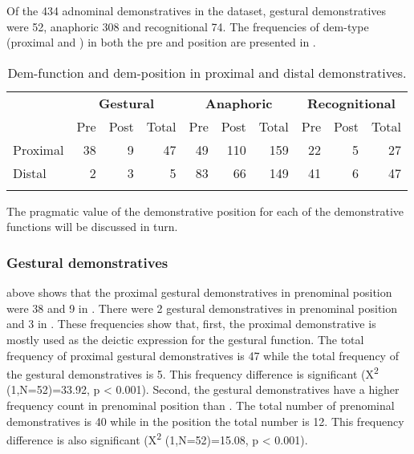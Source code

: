 \documentclass[output=paper,
modfonts
]{langscibook}
\begin{document}
Of the 434 adnominal demonstratives in the dataset, gestural demonstratives were 52, anaphoric 308 and recognitional 74. The frequencies of dem-type (proximal and ) in both the pre and  position are presented in .

\begin{table}
\begin{tabularx}{\textwidth}{X rrr  rrr  rrr} 
\lsptoprule
& \multicolumn{3}{c}{{\bfseries Gestural}} & \multicolumn{3}{c}{{\bfseries Anaphoric}} & \multicolumn{3}{c}{{\bfseries Recognitional}}\\\cmidrule(lr){2-4}\cmidrule(lr){5-7}\cmidrule(lr){8-10}
& Pre & Post & Total & Pre & Post & Total & Pre & Post & Total\\
\midrule
{ Proximal} & 38 & 9 & 47 & 49 & 110 & 159 & 22 & 5 & 27\\
{ Distal} & 2 & 3 & 5 & 83 & 66 & 149 & 41 & 6 & 47\\
\lspbottomrule
\end{tabularx}

\caption{Dem-function and dem-position in proximal and distal demonstratives.}
\label{tab:mwamzandi:3}
\end{table}

The pragmatic value of the demonstrative position for each of the demonstrative functions will be discussed in turn.

\subsubsection{Gestural demonstratives}\label{sec:mwamzandi:3.1.1}

 above shows that the proximal gestural demonstratives in prenominal position were 38 and 9 in . There were 2  gestural demonstratives in prenominal position and 3 in . These frequencies show that, first, the proximal demonstrative is mostly used as the deictic expression for the gestural function. The total frequency of proximal gestural demonstratives is 47 while the total frequency of the  gestural demonstratives is 5. This frequency difference is significant (X\textsuperscript{2} (1,N=52)=33.92, p < 0.001). Second, the gestural demonstratives have a higher frequency count in prenominal position than . The total number of prenominal demonstratives is 40 while in the  position the total number is 12. This frequency difference is also significant (X\textsuperscript{2} (1,N=52)=15.08, p < 0.001).
\end{document}

